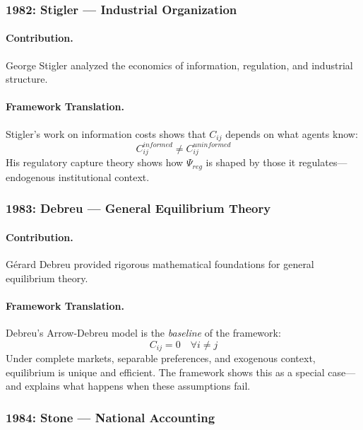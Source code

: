\documentclass[12pt,a4paper]{article}
\begin{document}
\subsubsection{1982: Stigler --- Industrial Organization}

\paragraph{Contribution.}
George Stigler analyzed the economics of information, regulation, and
industrial structure.

\paragraph{Framework Translation.}
Stigler's work on information costs shows that $C_{ij}$ depends on
what agents know:
\begin{equation}
  C_{ij}^{informed} \neq C_{ij}^{uninformed}
\end{equation}
His regulatory capture theory shows how $\Psi_{reg}$ is shaped by
those it regulates---endogenous institutional context.

\subsubsection{1983: Debreu --- General Equilibrium Theory}

\paragraph{Contribution.}
Gérard Debreu provided rigorous mathematical foundations for
general equilibrium theory.

\paragraph{Framework Translation.}
Debreu's Arrow-Debreu model is the \emph{baseline} of the framework:
\begin{equation}
  C_{ij} = 0 \quad \forall i \neq j
\end{equation}
Under complete markets, separable preferences, and exogenous context,
equilibrium is unique and efficient. The framework shows this as
a special case---and explains what happens when these assumptions fail.

\subsubsection{1984: Stone --- National Accounting}
\end{document}
